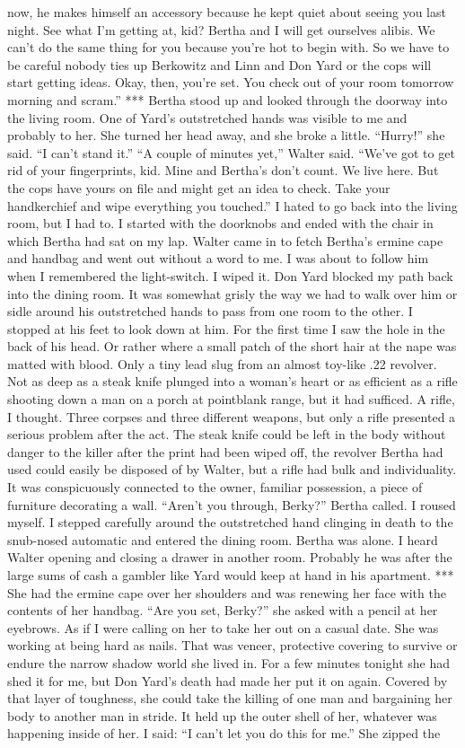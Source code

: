 \documentclass{novel}
\begin{document}
now, he makes himself an accessory because he kept quiet about seeing you last night. See what I’m getting at, kid? Bertha and I will get ourselves alibis. We can’t do the same thing for you because you’re hot to begin with. So we have to be careful nobody ties up Berkowitz and Linn and Don Yard or the cops will start getting ideas. Okay, then, you’re set. You check out of your room tomorrow morning and scram.” *** Bertha stood up and looked through the doorway into the living room. One of Yard’s outstretched hands was visible to me and probably to her. She turned her head away, and she broke a little. “Hurry!” she said. “I can’t stand it.” “A couple of minutes yet,” Walter said. “We’ve got to get rid of your fingerprints, kid. Mine and Bertha’s don’t count. We live here. But the cops have yours on file and might get an idea to check. Take your handkerchief and wipe everything you touched.” I hated to go back into the living room, but I had to. I started with the doorknobs and ended with the chair in which Bertha had sat on my lap. Walter came in to fetch Bertha’s ermine cape and handbag and went out without a word to me. I was about to follow him when I remembered the light-switch. I wiped it. Don Yard blocked my path back into the dining room. It was somewhat grisly the way we had to walk over him or sidle around his outstretched hands to pass from one room to the other. I stopped at his feet to look down at him. For the first time I saw the hole in the back of his head. Or rather where a small patch of the short hair at the nape was matted with blood. Only a tiny lead slug from an almost toy-like .22 revolver. Not as deep as a steak knife plunged into a woman’s heart or as efficient as a rifle shooting down a man on a porch at pointblank range, but it had sufficed. A rifle, I thought. Three corpses and three different weapons, but only a rifle presented a serious problem after the act. The steak knife could be left in the body without danger to the killer after the print had been wiped off, the revolver Bertha had used could easily be disposed of by Walter, but a rifle had bulk and individuality. It was conspicuously connected to the owner, familiar possession, a piece of furniture decorating a wall. “Aren’t you through, Berky?” Bertha called. I roused myself. I stepped carefully around the outstretched hand clinging in death to the snub-nosed automatic and entered the dining room. Bertha was alone. I heard Walter opening and closing a drawer in another room. Probably he was after the large sums of cash a gambler like Yard would keep at hand in his apartment. *** She had the ermine cape over her shoulders and was renewing her face with the contents of her handbag. “Are you set, Berky?” she asked with a pencil at her eyebrows. As if I were calling on her to take her out on a casual date. She was working at being hard as nails. That was veneer, protective covering to survive or endure the narrow shadow world she lived in. For a few minutes tonight she had shed it for me, but Don Yard’s death had made her put it on again. Covered by that layer of toughness, she could take the killing of one man and bargaining her body to another man in stride. It held up the outer shell of her, whatever was happening inside of her. I said: “I can’t let you do this for me.” She zipped the 
\end{document}
